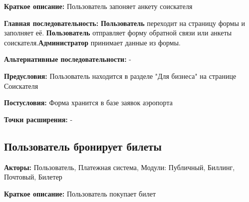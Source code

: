 \textbf{Краткое описание:} Пользователь запоняет анкету соискателя

\textbf{Главная последовательность:} \textbf{Пользователь} переходит на страницу формы и заполняет её.
\textbf{Пользователь} отправляет форму обратной связи или
анкеты соискателя.\textbf{Администратор} принимает данные из формы.

\textbf{Альтернативные последовательности:} -

\textbf{Предусловия:} Пользователь находится в разделе "Для бизнеса" на странице Соискателя

\textbf{Постусловия:} Форма хранится в базе заявок аэропорта

\textbf{Точки расширения:} -




\subsection{Пользователь бронирует билеты}

\textbf{Акторы:} Пользователь, Платежная система, Модули: Публичный, Биллинг, Почтовый, Билетер

\textbf{Краткое описание:} Пользователь покупает билет


